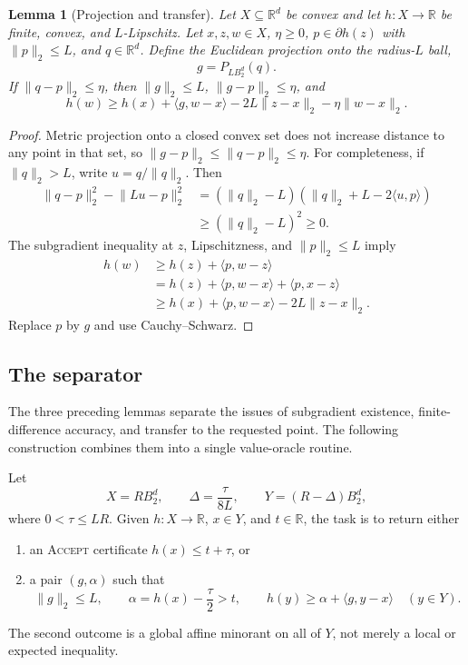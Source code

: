\documentclass[11pt]{article}
\numberwithin{equation}{section}
\newtheorem{lemma}[lemma]{Lemma}
\theoremstyle{remark}
\theoremstyle{definition}
\newcommand{\R}{\mathbb{R}}
\newcommand{\Ball}{B_2}
\newcommand{\ip}[2]{\langle #1,#2\rangle}
\newcommand{\norm}[1]{\lVert #1\rVert_2}
\begin{document}
\begin{lemma}[Projection and transfer]
\label{lem:projection-transfer}
Let $X\subseteq\R^d$ be convex and let $h:X\to\R$ be finite, convex,
and $L$-Lipschitz. Let $x,z,w\in X$, $\eta\ge0$,
$p\in\partial h(z)$ with $\norm p\le L$, and $q\in\R^d$.
Define the Euclidean projection onto the radius-$L$ ball,
\[
g=P_{L\Ball^d}(q).
\]
If $\norm{q-p}\le\eta$, then $\norm g\le L$, $\norm{g-p}\le\eta$, and
\begin{equation}
h(w)\ge h(x)+\ip g{w-x}
-2L\norm{z-x}-\eta\norm{w-x}.
\label{eq:projection-transfer}
\end{equation}
\end{lemma}

\begin{proof}
Metric projection onto a closed convex set does not increase distance to any point in that set, so $\norm{g-p}\le\norm{q-p}\le\eta$.  For completeness, if $\norm q>L$, write $u=q/\norm q$.  Then
\begin{align*}
\norm{q-p}^2-\norm{Lu-p}^2
&=(\norm q-L)(\norm q+L-2\ip up)\\
&\ge(\norm q-L)^2\ge0.
\end{align*}
The subgradient inequality at $z$, Lipschitzness, and $\norm p\le L$ imply
\begin{align*}
h(w)
&\ge h(z)+\ip p{w-z}\\
&=h(z)+\ip p{w-x}+\ip p{x-z}\\
&\ge h(x)+\ip p{w-x}-2L\norm{z-x}.
\end{align*}
Replace $p$ by $g$ and use Cauchy--Schwarz.
\end{proof}

\subsection{The separator}

The three preceding lemmas separate the issues of subgradient
existence, finite-difference accuracy, and transfer to the requested
point. The following construction combines them into a single
value-oracle routine.

Let
\[
X=R\Ball^d,
\qquad
\Delta=\frac{\tau}{8L},
\qquad
Y=(R-\Delta)\Ball^d,
\]
where $0<\tau\le LR$.  Given $h:X\to\R$, $x\in Y$, and $t\in\R$, the task is to return either
\begin{enumerate}
\item an \textsc{Accept} certificate $h(x)\le t+\tau$, or
\item a pair $(g,\alpha)$ such that
\[
\norm g\le L,
\qquad
\alpha=h(x)-\frac\tau2>t,
\qquad
h(y)\ge\alpha+\ip g{y-x}\quad(y\in Y).
\]
\end{enumerate}
The second outcome is a global affine minorant on all of $Y$, not merely a local or expected inequality.
\end{document}
